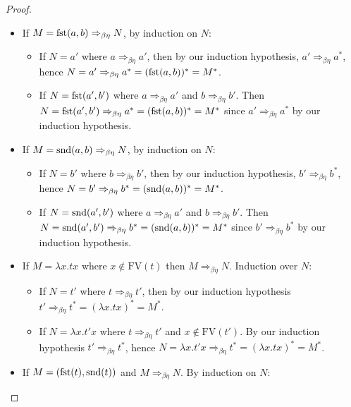\begin{proof}
\begin{itemize}
\begin{itemize}
        \end{itemize}
        \item If $M = \mathrm{fst}(a, b) \Rightarrow_{\beta\eta} N$, by induction on $N$:
        \begin{itemize}
            \item If $N= a'$ where $a \Rightarrow_{\beta\eta} a'$, then by our induction hypothesis, $a' \Rightarrow_{\beta\eta} a^*$, hence $N = a' \Rightarrow_{\beta\eta} a^* = (\mathrm{fst}(a, b))^* = M^*$.
            \item If $N = \mathrm{fst}(a', b')$ where $a \Rightarrow_{\beta\eta} a'$ and $b \Rightarrow_{\beta\eta} b'$. Then $N = \mathrm{fst}(a', b') \Rightarrow_{\beta\eta} a^* = (\mathrm{fst}(a, b))^* = M^*$ since $a' \Rightarrow_{\beta\eta} a^*$ by our induction hypothesis.
        \end{itemize}
        \item If $M = \mathrm{snd}(a, b) \Rightarrow_{\beta\eta} N$, by induction on $N$:
        \begin{itemize}
            \item If $N= b'$ where $b \Rightarrow_{\beta\eta} b'$, then by our induction hypothesis, $b' \Rightarrow_{\beta\eta} b^*$, hence $N = b' \Rightarrow_{\beta\eta} b^* = (\mathrm{snd}(a, b))^* = M^*$.
            \item If $N = \mathrm{snd}(a', b')$ where $a \Rightarrow_{\beta\eta} a'$ and $b \Rightarrow_{\beta\eta} b'$. Then $N = \mathrm{snd}(a', b') \Rightarrow_{\beta\eta} b^* = (\mathrm{snd}(a, b))^* = M^*$ since $b' \Rightarrow_{\beta\eta} b^*$ by our induction hypothesis.
        \end{itemize}
        \item If $M = \lambda x. t x$ where $x \not \in \mathrm{FV}(t)$ then $M \Rightarrow_{\beta\eta} N$. Induction over $N$:
        \begin{itemize}
            \item If $N = t'$ where $t \Rightarrow_{\beta\eta} t'$, then by our induction hypothesis $t' \Rightarrow_{\beta\eta} t^* = (\lambda x . t x)^* = M^*$.
            \item If $N = \lambda x . t' x$ where $t \Rightarrow_{\beta\eta} t'$ and $x \not \in \mathrm{FV}(t')$. By our induction hypothesis $t' \Rightarrow_{\beta\eta} t^*$, hence $N = \lambda x . t' x \Rightarrow_{\beta\eta} t^* = (\lambda x . t x)^* = M^*$.
        \end{itemize}
        \item If $M = (\mathrm{fst}(t), \mathrm{snd}(t))$ and $M \Rightarrow_{\beta\eta} N$. By induction on $N$:
        \begin{itemize}

\end{itemize}
\end{itemize}
\end{proof}
